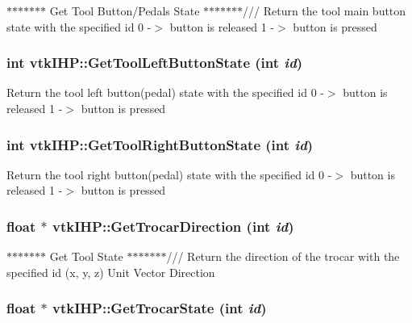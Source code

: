 $\ast$$\ast$$\ast$$\ast$$\ast$$\ast$$\ast$ Get Tool Button/Pedals State $\ast$$\ast$$\ast$$\ast$$\ast$$\ast$$\ast$/// Return the tool main button state with the specified id 0 -\/$>$ button is released 1 -\/$>$ button is pressed \hypertarget{classvtkIHP_af7a915155ec7b4e77ea788080ec7bda9}{
\subsubsection[{GetToolLeftButtonState}]{\setlength{\rightskip}{0pt plus 5cm}int vtkIHP::GetToolLeftButtonState (int {\em id})}}
\label{classvtkIHP_af7a915155ec7b4e77ea788080ec7bda9}
Return the tool left button(pedal) state with the specified id 0 -\/$>$ button is released 1 -\/$>$ button is pressed \hypertarget{classvtkIHP_a3b90d186241d7839a7b17fcf758ca680}{
\subsubsection[{GetToolRightButtonState}]{\setlength{\rightskip}{0pt plus 5cm}int vtkIHP::GetToolRightButtonState (int {\em id})}}
\label{classvtkIHP_a3b90d186241d7839a7b17fcf758ca680}
Return the tool right button(pedal) state with the specified id 0 -\/$>$ button is released 1 -\/$>$ button is pressed \hypertarget{classvtkIHP_a51ffd1fb138d362a766df8de9e5ccbdb}{
\subsubsection[{GetTrocarDirection}]{\setlength{\rightskip}{0pt plus 5cm}float $\ast$ vtkIHP::GetTrocarDirection (int {\em id})}}
\label{classvtkIHP_a51ffd1fb138d362a766df8de9e5ccbdb}


$\ast$$\ast$$\ast$$\ast$$\ast$$\ast$$\ast$ Get Tool State $\ast$$\ast$$\ast$$\ast$$\ast$$\ast$$\ast$/// Return the direction of the trocar with the specified id (x, y, z) Unit Vector Direction \hypertarget{classvtkIHP_aea98689cc76883453f1b0099609cdaac}{
\subsubsection[{GetTrocarState}]{\setlength{\rightskip}{0pt plus 5cm}float $\ast$ vtkIHP::GetTrocarState (int {\em id})}}
\label{classvtkIHP_aea98689cc76883453f1b0099609cdaac}


